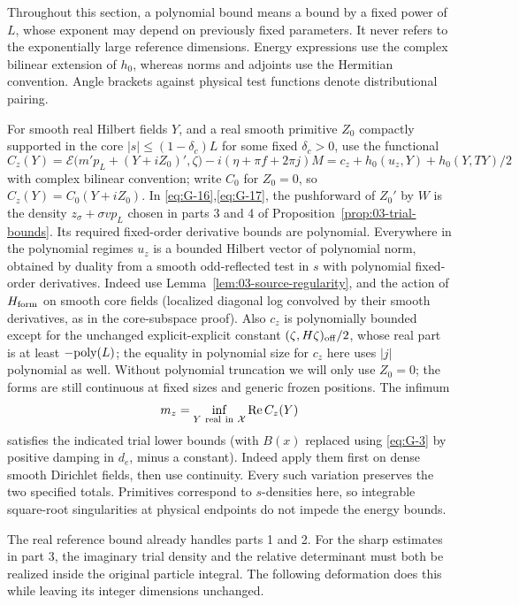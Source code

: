 Throughout this section, a polynomial bound means a bound by a fixed power of \(L\), whose exponent may depend on previously fixed parameters. It never refers to the exponentially large reference dimensions. Energy expressions use the complex bilinear extension of \(h_0\), whereas norms and adjoints use the Hermitian convention. Angle brackets against physical test functions denote distributional pairing.

For smooth real Hilbert fields \(Y\), and a real smooth primitive \(Z_0\) compactly supported in the core \(|s|\le(1-\delta_c)L\) for some fixed \(\delta_c>0\), use the functional
\[
 C_z(Y)=\mathcal E\big(m'p_L+(Y+iZ_0)',\zeta\big)-i(\eta+\pi f+2\pi j)M
       =c_z+h_0(u_z,Y)+h_0(Y,TY)/2
\]
with complex bilinear convention; write \(C_0\) for \(Z_0=0\), so \(C_z(Y)=C_0(Y+iZ_0)\). In \eqref{eq:G-16},\eqref{eq:G-17}, the pushforward of \(Z_0'\)
by \(W\) is the density \(z_\sigma+\sigma v p_L\) chosen in
parts 3 and 4 of Proposition~\ref{prop:03-trial-bounds}. Its required fixed-order derivative bounds are polynomial. Everywhere in the polynomial regimes \(u_z\) is a bounded Hilbert vector of polynomial norm, obtained by duality from a smooth odd-reflected test in \(s\) with polynomial fixed-order derivatives. Indeed use Lemma~\ref{lem:03-source-regularity}, and the action of \(H_{\rm form}\) on smooth core fields (localized diagonal log convolved by their smooth derivatives, as in the core-subspace proof). Also \(c_z\) is polynomially bounded except for the unchanged explicit-explicit constant \((\zeta,H\zeta)_{\rm off}/2\), whose real part is at least \(-{\rm poly}(L)\); the equality in polynomial size for \(c_z\) here uses \(|j|\) polynomial as well. Without polynomial truncation we will only use \(Z_0=0\); the forms are still continuous at fixed sizes and generic frozen positions. The infimum
\[
 m_z=\inf_{Y\ {\rm real\ in}\ \mathcal X}\operatorname{Re} C_z(Y)
\]
satisfies the indicated trial lower bounds (with \(B(x)\) replaced using \eqref{eq:G-3} by positive damping in \(d_e\), minus a constant). Indeed apply them first on dense smooth Dirichlet fields, then use continuity. Every such variation preserves the two specified totals. Primitives correspond to \(s\)-densities here, so integrable square-root singularities at physical endpoints do not impede the energy bounds.

The real reference bound already handles parts 1 and 2. For the sharp
estimates in part 3, the imaginary trial density and the relative
determinant must both be realized inside the original particle integral.
The following deformation does this while leaving its integer dimensions
unchanged.

